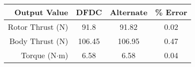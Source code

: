         \begin{tabular}{ r | c | c | c }
            Output Value & DFDC & Alternate & \% Error \\
            \hline
            Rotor Thrust (N) & 91.8 & 91.82 & 0.02 \\
            Body Thrust (N) & 106.45 & 106.95 & 0.47 \\
            Torque (N\(\cdot\)m) & 6.58 & 6.58 & 0.04 \\
        \end{tabular}
